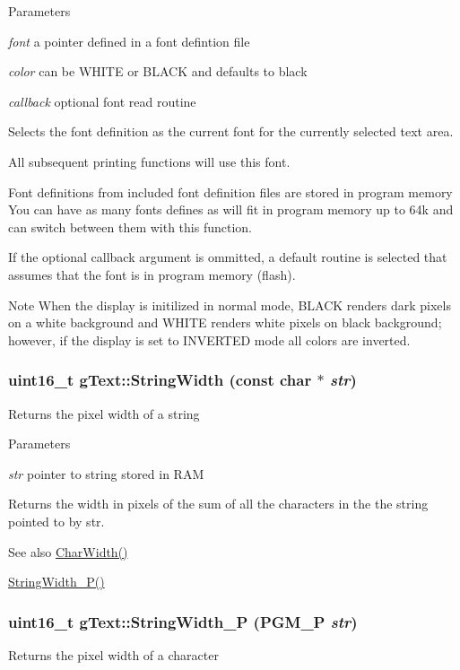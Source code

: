 \begin{DoxyParams}{Parameters}
\item[{\em font}]a pointer defined in a font defintion file \item[{\em color}]can be WHITE or BLACK and defaults to black \item[{\em callback}]optional font read routine\end{DoxyParams}
Selects the font definition as the current font for the currently selected text area.

All subsequent printing functions will use this font.

Font definitions from included font definition files are stored in program memory You can have as many fonts defines as will fit in program memory up to 64k and can switch between them with this function.

If the optional callback argument is ommitted, a default routine is selected that assumes that the font is in program memory (flash).

\begin{DoxyNote}{Note}
When the display is initilized in normal mode, BLACK renders dark pixels on a white background and WHITE renders white pixels on black background; however, if the display is set to INVERTED mode all colors are inverted. 
\end{DoxyNote}
\hypertarget{classg_text_a0dce9ad4c40e0d8b0487f4d2303bd8ef}{
\subsubsection[{StringWidth}]{\setlength{\rightskip}{0pt plus 5cm}uint16\_\-t gText::StringWidth (const char $\ast$ {\em str})}}
\label{classg_text_a0dce9ad4c40e0d8b0487f4d2303bd8ef}
Returns the pixel width of a string


\begin{DoxyParams}{Parameters}
\item[{\em str}]pointer to string stored in RAM\end{DoxyParams}
\begin{DoxyReturn}{Returns}
the width in pixels of the sum of all the characters in the the string pointed to by str.
\end{DoxyReturn}
\begin{DoxySeeAlso}{See also}
\hyperlink{classg_text_a6cb49e22a690752ea439e2773ae31ec1}{CharWidth()} 

\hyperlink{classg_text_ae6f8d92ff8240dee9e32f74b1cbff44a}{StringWidth\_\-P()} 
\end{DoxySeeAlso}
\hypertarget{classg_text_ae6f8d92ff8240dee9e32f74b1cbff44a}{
\subsubsection[{StringWidth\_\-P}]{\setlength{\rightskip}{0pt plus 5cm}uint16\_\-t gText::StringWidth\_\-P (PGM\_\-P {\em str})}}
\label{classg_text_ae6f8d92ff8240dee9e32f74b1cbff44a}
Returns the pixel width of a character


